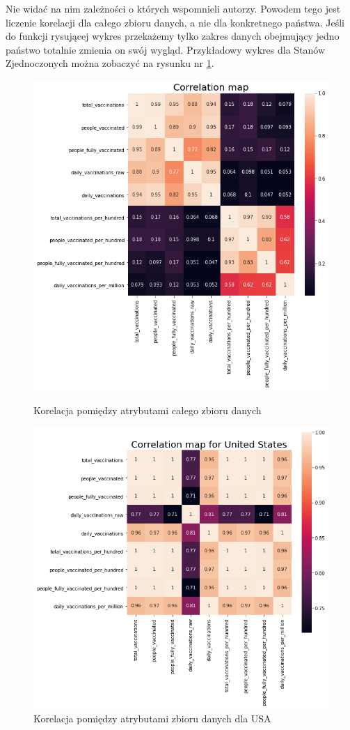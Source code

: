 \documentclass[12pt, oneside]{article}
\begin{document}
Nie widać na nim zależności o których wspomnieli autorzy. Powodem tego jest liczenie korelacji dla całego zbioru danych, a nie dla konkretnego państwa. Jeśli do funkcji rysującej wykres przekażemy tylko zakres danych obejmujący jedno państwo totalnie zmienia on swój wygląd. Przykładowy wykres dla Stanów Zjednoczonych można zobaczyć na rysunku nr \ref{Rys:corrHeatMapUsa}.


\begin{figure}[!ht]

\centering
\includegraphics[scale=0.45]{../img/corelation.png} 
\caption{Korelacja pomiędzy atrybutami całego zbioru danych\label{Rys:corrHeatMapWorld}}

\centering
\includegraphics[scale=0.45]{../img/usa_corr.png} 
\caption{Korelacja pomiędzy atrybutami zbioru danych dla USA}
\label{Rys:corrHeatMapUsa}


\end{figure}
\end{document}
